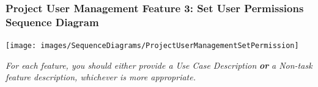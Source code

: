 \documentclass[twoside,letterpaper]{article}
\begin{document}
\subsubsection[Project User Management Feature 3: Set User Permissions Sequence Diagram]{\rmfamily\bfseries\color{black}
	Project User Management Feature 3: Set User Permissions Sequence Diagram}
\hypertarget{RefHeading22059017292}{}
\texttt{[image: images/SequenceDiagrams/ProjectUserManagementSetPermission]}
\newpage




{\color{black}
	\foreignlanguage{english}{\textit{For each feature, you should either provide a Use Case Description
		}}\foreignlanguage{english}{\textbf{\textit{or}}}\foreignlanguage{english}{\textit{ a Non-task feature description,
		whichever is more appropriate.}}}
\newpage
\end{document}
